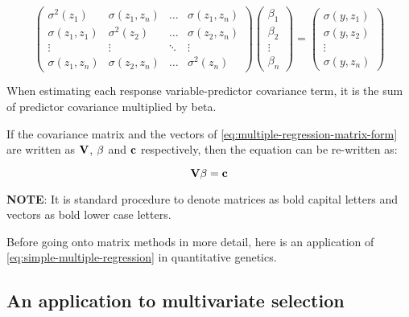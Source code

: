 \documentclass[
]{book}
\begin{document}
\begin{equation}
    \begin{pmatrix}
        \sigma^2(z_1) & \sigma(z_1, z_n) & \dots & \sigma(z_1, z_n) \\
        \sigma(z_1, z_1) & \sigma^2(z_2) & \dots & \sigma(z_2, z_n) \\
        \vdots & \vdots & \ddots & \vdots \\
        \sigma(z_1, z_n) & \sigma(z_2, z_n) & \dots & \sigma^2(z_n)
    \end{pmatrix}
    \begin{pmatrix}
        \beta_1 \\
        \beta_2 \\
        \vdots \\
        \beta_n
    \end{pmatrix}
    =
    \begin{pmatrix}
        \sigma(y, z_1) \\
        \sigma(y, z_2) \\
        \vdots \\
        \sigma(y, z_n)
    \end{pmatrix}
    \label{eq:multiple-regression-matrix-form}
\end{equation}

When estimating each response variable-predictor covariance term, it is the sum of predictor covariance multiplied by beta.

If the covariance matrix and the vectors of \eqref{eq:multiple-regression-matrix-form} are written as \(\mathbf{V}\), \(\mathbf{\beta}\) and \(\mathbf{c}\) respectively, then the equation can be re-written as:

\begin{equation}
    \mathbf{V\beta} = \mathbf{c}
    \label{eq:abbreviated-multiple-regression}
\end{equation}

\textbf{NOTE}: It is standard procedure to denote matrices as bold capital letters and vectors as bold lower case letters.

Before going onto matrix methods in more detail, here is an application of \eqref{eq:simple-multiple-regression} in quantitative genetics.

\hypertarget{an-application-to-multivariate-selection}{%
\subsection{An application to multivariate selection}\label{an-application-to-multivariate-selection}}
\end{document}
